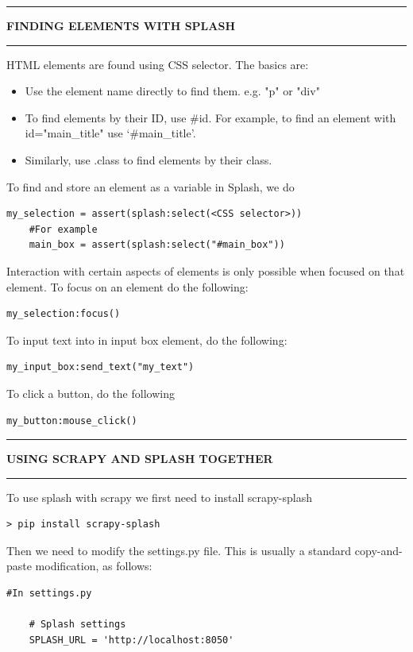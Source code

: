 \documentclass[8pt]{extarticle}
\newcommand{\heading}[1]{%
    \noindent
    \rule{\linewidth}{0.4pt}
    \begin{center}
        \vspace{-1ex}
        \textbf{#1}        
        \vspace{-2.5ex}
    \end{center}
    \rule{\linewidth}{0.4pt}
}
\begin{document}
\begin{multicols}{3}
\heading{FINDING ELEMENTS WITH SPLASH}

HTML elements are found using CSS selector. The basics are:
\begin{itemize}
    \item Use the element name directly to find them. e.g. "p" or "div"
    \item To find elements by their ID, use \#id. For example, to find an element with id="main\_title" use `\#main\_title'.
    
    \item Similarly, use .class to find elements by their class.
\end{itemize}

To find and store an element as a variable in Splash, we do

\begin{lstlisting}[style=python]
    my_selection = assert(splash:select(<CSS selector>))
    #For example
    main_box = assert(splash:select("#main_box"))
\end{lstlisting}

Interaction with certain aspects of elements is only possible when focused on that element. To focus on an element do the following:
\begin{lstlisting}[style=python]
    my_selection:focus()
\end{lstlisting}

To input text into in input box element, do the following:

\begin{lstlisting}[style=python]
    my_input_box:send_text("my_text")
\end{lstlisting}

To click a button, do the following
\begin{lstlisting}[style=python]
    my_button:mouse_click()
\end{lstlisting}

\heading{USING SCRAPY AND SPLASH TOGETHER}

To use splash with scrapy we first need to install scrapy-splash
\begin{lstlisting}[style=python]
    > pip install scrapy-splash
\end{lstlisting}

Then we need to modify the settings.py file. This is usually a standard copy-and-paste modification, as follows:
\begin{lstlisting}[style=python]
    #In settings.py
    
    # Splash settings
    SPLASH_URL = 'http://localhost:8050'
    

\end{lstlisting}
\end{multicols}
\end{document}
